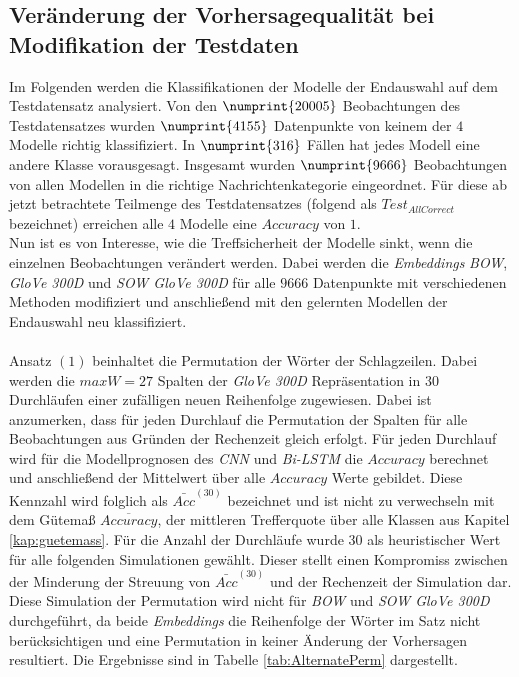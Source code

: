 \documentclass[a4paper,11pt]{article}
\begin{document}
\subsection{Veränderung der Vorhersagequalität bei Modifikation der Testdaten}\label{kap:alternate}

Im Folgenden werden die Klassifikationen der Modelle der Endauswahl auf dem Testdatensatz analysiert.
Von den $\numprint{20005}$ Beobachtungen des Testdatensatzes wurden $\numprint{4155}$ Datenpunkte von keinem der $4$ Modelle richtig klassifiziert.
In $\numprint{316}$ Fällen hat jedes Modell eine andere Klasse vorausgesagt. Insgesamt wurden $\numprint{9666}$ Beobachtungen von allen Modellen in die richtige Nachrichtenkategorie eingeordnet. Für diese ab jetzt betrachtete Teilmenge des Testdatensatzes (folgend als $Test_{AllCorrect}$ bezeichnet) erreichen alle $4$ Modelle eine $Accuracy$ von $1$. \\
Nun ist es von Interesse, wie die Treffsicherheit der Modelle sinkt, wenn die einzelnen Beobachtungen verändert werden. Dabei werden die \textit{Embeddings} \textit{BOW}, \textit{GloVe 300D} und \textit{SOW GloVe 300D} für alle $9666$ Datenpunkte mit verschiedenen Methoden modifiziert und anschließend mit den gelernten Modellen der Endauswahl neu klassifiziert.\\
\\
Ansatz $(1)$ beinhaltet die Permutation der Wörter der Schlagzeilen. Dabei werden die $maxW = 27$ Spalten der \textit{GloVe 300D} Repräsentation in $30$ Durchläufen einer zufälligen neuen Reihenfolge zugewiesen. Dabei ist anzumerken, dass für jeden Durchlauf die Permutation der Spalten für alle Beobachtungen aus Gründen der Rechenzeit gleich erfolgt. Für jeden Durchlauf wird für die Modellprognosen des \textit{CNN} und \textit{Bi-LSTM} die $Accuracy$ berechnet und anschließend der Mittelwert über alle $Accuracy$ Werte gebildet. 
Diese Kennzahl wird folglich als $\bar{Acc}^{(30)}$ bezeichnet und ist nicht zu verwechseln mit dem Gütemaß $\overline{Accuracy}$, der mittleren Trefferquote über alle Klassen aus Kapitel \ref{kap:guetemass}.
Für die Anzahl der Durchläufe wurde $30$ als heuristischer Wert für alle folgenden Simulationen gewählt. Dieser stellt einen Kompromiss zwischen der Minderung der Streuung von $\bar{Acc}^{(30)}$ und der Rechenzeit der Simulation dar. Diese Simulation der Permutation wird nicht für \textit{BOW} und \textit{SOW GloVe 300D} durchgeführt, da beide \textit{Embeddings} die Reihenfolge der Wörter im Satz nicht berücksichtigen und eine Permutation in keiner Änderung der Vorhersagen resultiert. Die Ergebnisse sind in Tabelle \ref{tab:AlternatePerm} dargestellt.
\end{document}
